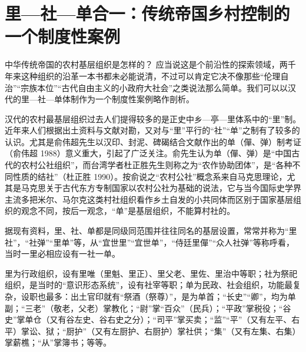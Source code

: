 \documentclass[a4paper,12pt,punct=kaiming,fontset=none]{ctexart}
\begin{document}
\section*{里—社—单合一：传统帝国乡村控制的一个制度性案例}

中华传统帝国的农村基层组织是怎样的？ 应当说这是个前沿性的探索领域，两千年来这种组织的沿革一本书都未必能说清，不过可以肯定它决不像那些“伦理自治”“宗族本位”“古代自由主义的小政府大社会”之类说法那么简单。我们可以以汉代的里—社—单体制作为一个制度性案例略作剖析。

汉代的农村最基层组织过去人们提得较多的是正史中乡—亭—里体系中的“里”制。近年来人们根据出土资料与文献对勘，又对与“里”平行的“社”“单”之制有了较多的认识。尤其是俞伟超先生以汉印、封泥、碑碣结合文献作出的单（僤、弹）制考证（俞伟超 1988）意义重大，引起了广泛关注。俞先生认为单（僤、弹）是“中国古代的农村公社组织”，而台湾学者杜正胜先生则称之为“农作协助团体”，是“各种不同性质的结社”（杜正胜 1990）。按俞说之“农村公社”概念系来自马克思理论，尤其是马克思关于古代东方专制国家以农村公社为基础的说法，它与当今国际史学界主流多把米尔、马尔克这类村社组织看作乡土自发的小共同体而区别于国家基层组织的观念不同，按后一观念，“单”是基层组织，不能算村社的。

据现有资料，里、社、单都是同级同范围并往往同名的基层设置，常常并称为“里社”，“社弹”“里单”等，从“宜世里”“宜世单”，“侍廷里僤”“众人社弹”等称呼看，当时一里必相应设有一社一单。

里为行政组织，设有里唯（里魁、里正）、里父老、里佐、里治中等职；社为祭祀组织，是当时的“意识形态系统”，设有社宰等职；单为民政、社会组织，功能最复杂，设职也最多：出土官印就有“祭酒（祭尊）”，是为单首；“长史”“卿”，均为单副；“三老”（敬老，父老）掌教化；“尉”掌“百众”（民兵）；“平政”掌税役；“谷史”掌单仓（又有谷左史、谷右史之分）；“司平”掌买卖；“监”“平”（又有左平、右平）掌讼、狱；“厨护”（又有左厨护、右厨护）掌社供；“集”（又有左集、右集）掌薪樵；“从”掌簿书；等等。
\end{document}
